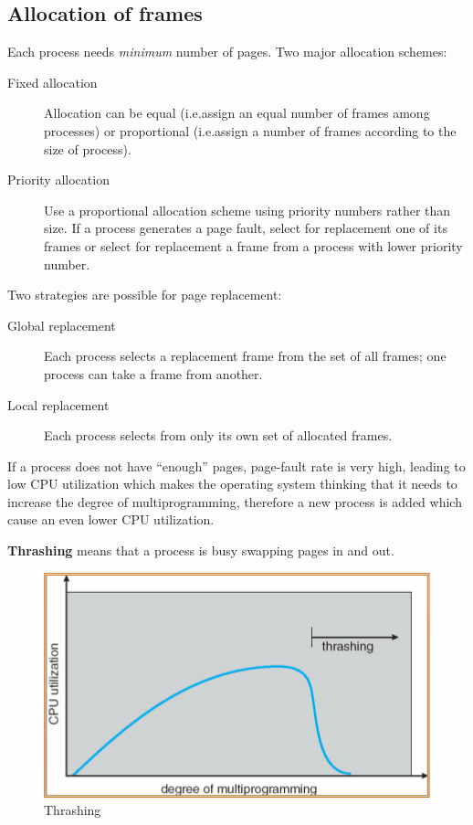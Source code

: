 \subsection{Allocation of frames}
Each process needs \emph{minimum} number of pages. Two major allocation schemes:
\begin{description}
\item [Fixed allocation] Allocation can be equal (i.e.\@ assign an equal number of frames among processes) or proportional (i.e.\@ assign a number of frames according to the size of process).
\item [Priority allocation] Use a proportional allocation scheme using priority numbers rather than size. If a process generates a page fault, select for replacement one of its frames or select for replacement a frame from a process with lower priority number.
\end{description}
Two strategies are possible for page replacement:
\begin{description}
\item [Global replacement] Each process selects a replacement frame from the set of all frames; one process can take a frame from another.
\item [Local replacement] Each process selects from only its own set of allocated frames.
\end{description}
If a process does not have ``enough'' pages, page-fault rate is very high, leading to low CPU utilization which makes the operating system thinking that it needs to increase the degree of multiprogramming, therefore a new process is added which cause an even lower CPU utilization.

\textbf{Thrashing} means that a process is busy swapping pages in and out.

\begin{figure}[hbtp]
\centering
\includegraphics[scale=0.4]{images/virtual_memory/thrashing.jpg}
\caption{Thrashing}
\end{figure}

